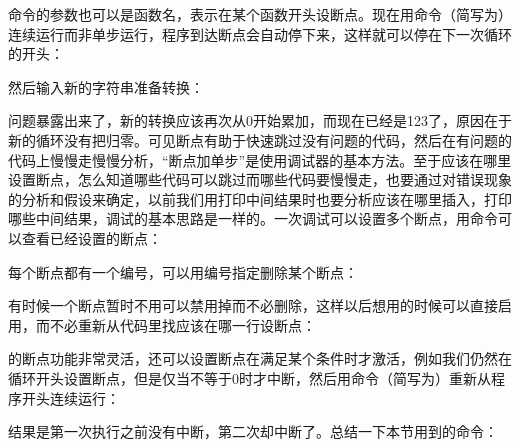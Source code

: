 

命令的参数也可以是函数名，表示在某个函数开头设断点。现在用命令（简写为）连续运行而非单步运行，程序到达断点会自动停下来，这样就可以停在下一次循环的开头：




然后输入新的字符串准备转换：




问题暴露出来了，新的转换应该再次从0开始累加，而现在已经是123了，原因在于新的循环没有把归零。可见断点有助于快速跳过没有问题的代码，然后在有问题的代码上慢慢走慢慢分析，“断点加单步”是使用调试器的基本方法。至于应该在哪里设置断点，怎么知道哪些代码可以跳过而哪些代码要慢慢走，也要通过对错误现象的分析和假设来确定，以前我们用打印中间结果时也要分析应该在哪里插入，打印哪些中间结果，调试的基本思路是一样的。一次调试可以设置多个断点，用命令可以查看已经设置的断点：




每个断点都有一个编号，可以用编号指定删除某个断点：




有时候一个断点暂时不用可以禁用掉而不必删除，这样以后想用的时候可以直接启用，而不必重新从代码里找应该在哪一行设断点：




的断点功能非常灵活，还可以设置断点在满足某个条件时才激活，例如我们仍然在循环开头设置断点，但是仅当不等于0时才中断，然后用命令（简写为）重新从程序开头连续运行：




结果是第一次执行之前没有中断，第二次却中断了。总结一下本节用到的命令：


